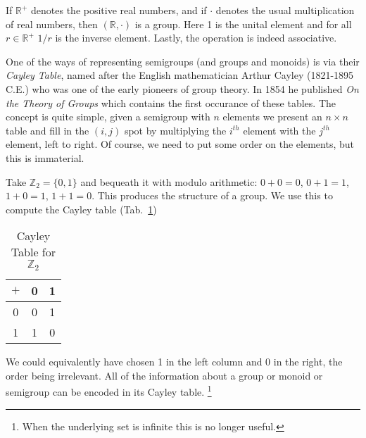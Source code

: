         \begin{example}
            If $\mathbb{R}^{+}$ denotes the positive real numbers, and if
            $\cdot$ denotes the usual multiplication of real numbers, then
            $(\mathbb{R},\cdot)$ is a group. Here 1 is the unital element and
            for all $r\in\mathbb{R}^{+}$ $1/r$ is the inverse element. Lastly,
            the operation is indeed associative.
        \end{example}
        One of the ways of representing semigroups (and groups and monoids) is
        via their \textit{Cayley Table}, named after the
        English mathematician Arthur Cayley (1821-1895 C.E.)%
         who was one of the early pioneers of group
        theory. In 1854 he published \textit{On the Theory of Groups} which
        contains the first occurance of these tables. The concept is quite
        simple, given a semigroup with $n$ elements we present an $n\times{n}$
        table and fill in the $(i,j)$ spot by multiplying the $i^{th}$ element
        with the $j^{th}$ element, left to right. Of course, we need to put some
        order on the elements, but this is immaterial.
        \begin{example}
            Take $\mathbb{Z}_{2}=\{0,1\}$ and bequeath it with modulo
            arithmetic: $0+0=0$, $0+1=1$, $1+0=1$, $1+1=0$. This produces the
            structure of a group. We use this to compute the Cayley table
            (Tab.~\ref{tab:Cayley_Table_Z2})
            \begin{table}[H]
                \centering
                \captionsetup{type=table}
                \begin{tabular}{c|cc}
                    $+$&0&1\\
                    \hline
                    0&0&1\\
                    1&1&0
                \end{tabular}
                \caption{Cayley Table for $\mathbb{Z}_{2}$}
                \label{tab:Cayley_Table_Z2}
            \end{table}
            We could equivalently have chosen 1 in the left column and 0 in the
            right, the order being irrelevant. All of the information about a
            group or monoid or semigroup can be encoded in its Cayley table.%
            \footnote{%
                When the underlying set is infinite this is no longer useful.
            }
        \end{example}
